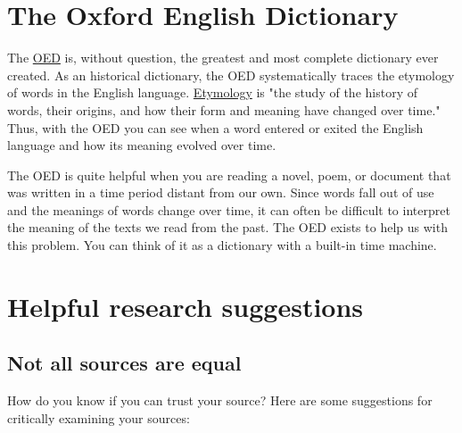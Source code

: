 \section{The Oxford English Dictionary}

The \href{http://www.oed.com/}{OED} is, without question, the  greatest and most
complete dictionary ever created. As an historical dictionary, the OED systematically traces the  etymology of words in the English language.  \href{http://en.wikipedia.org/wiki/Etymology}{Etymology} is
"the study of the history of words, their origins, and how their form and
meaning have  changed over time." Thus, with the OED you can see when a word
entered or exited the English language and how its meaning evolved over time.

The OED is quite helpful when you are reading a novel, poem, or document that
was written in a time period distant from our own. Since words fall out of use
and the meanings of words change over time, it can often be difficult to
interpret the meaning of the texts we read from the past. The OED exists to
help us with this problem. You can think of it as a dictionary with a built-in
time machine.

\section{Helpful research suggestions}

\subsection{Not all sources are equal}

How do you know if you can trust your source? Here are some suggestions for
critically examining your sources:

